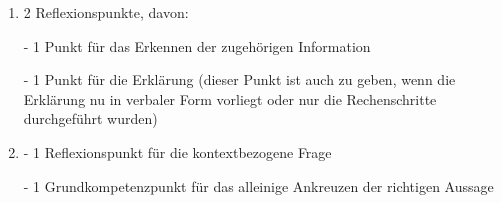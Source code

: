 \begin{langesbeispiel}
{\begin{enumerate}
	- 1 Reflexionspunkt (für das richtige Ankreuzen der zutreffenden Aussage)
	
	\item 2 Reflexionspunkte, davon:
	
	\hspace*{0.5cm} - 1 Punkt für das Erkennen der zugehörigen Information
	
	\hspace*{0.5cm} - 1 Punkt für die Erklärung (dieser Punkt ist auch zu geben, wenn \hspace*{0,5cm}die Erklärung nu in verbaler Form vorliegt oder nur die Rechenschritte \hspace*{0.5cm}durchgeführt wurden)
	
	\item - 1 Reflexionspunkt für die kontextbezogene Frage
	
	- 1 Grundkompetenzpunkt für das alleinige Ankreuzen der richtigen Aussage
			\end{enumerate}
		}
		\end{langesbeispiel}